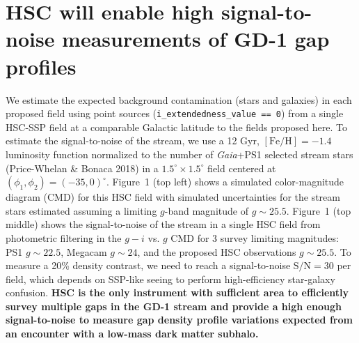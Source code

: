 \documentclass[11pt]{article}
\begin{document}
\section*{HSC will enable high signal-to-noise measurements of GD-1 gap profiles}

We estimate the expected background contamination (stars and galaxies) in each proposed field using point sources (\texttt{i\_extendedness\_value == 0}) from a single HSC-SSP field at a comparable Galactic latitude to the fields proposed here.
To estimate the signal-to-noise of the stream, we use a 12 Gyr, $[\textrm{Fe}/\textrm{H}] = -1.4$ luminosity function normalized to the number of \textit{Gaia}+PS1 selected stream stars (Price-Whelan \& Bonaca 2018) in a $1.5^\circ \times 1.5^\circ$ field centered at $(\phi_1, \phi_2) = (-35, 0)^\circ$.
Figure~1 (top left) shows a simulated color-magnitude diagram (CMD) for this HSC field with simulated uncertainties for the stream stars estimated assuming a limiting $g$-band magnitude of $g \sim 25.5$.
Figure~1 (top middle) shows the signal-to-noise of the stream in a single HSC field from photometric filtering in the $g-i$ vs. $g$ CMD for 3 survey limiting magnitudes: PS1 $g \sim 22.5$, Megacam $g \sim 24$, and the proposed HSC observations $g \sim 25.5$.
To measure a 20\% density contrast, we need to reach a signal-to-noise $\textrm{S}/\textrm{N} = 30$ per field, which depends on SSP-like seeing to perform high-efficiency star-galaxy confusion.
\textbf{HSC is the only instrument with sufficient area to efficiently survey multiple gaps in the GD-1 stream and provide a high enough signal-to-noise to measure gap density profile variations expected from an encounter with a low-mass dark matter subhalo.}

\end{document}
